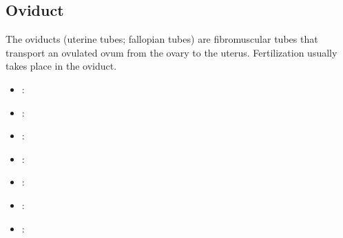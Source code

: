 \subsection{Oviduct}
The oviducts (uterine tubes; fallopian tubes) are fibromuscular tubes that transport an ovulated ovum from the ovary to the uterus. Fertilization usually takes place in the oviduct.
\begin{center}
\end{center}
\begin{multicols}{2}
\begin{itemize}
  \item {}:
  
  \begin{center}
  \end{center}
  
  \item {}:
  
  \begin{center}
  \end{center}
  
  \item {}:
  
  \begin{center}
  \end{center}
  
  \item {}:
  
  \begin{center}
  \end{center}
  
  \item {}:
  
  \begin{center}
  \end{center}
  
  \item {}:
  
  \begin{center}
  \end{center}

  \item {}:
  

\end{itemize}
\end{multicols}
